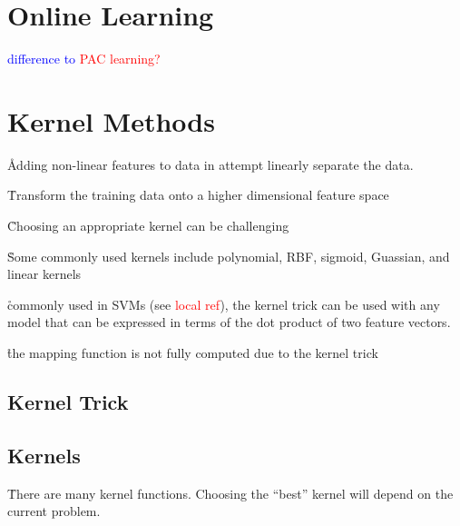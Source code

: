 \section{Online Learning}

\textcolor{blue}{difference to \textcolor{red}{PAC learning?}}


\section{Kernel Methods}
\label{sec:kernel_trick}

\r{Adding non-linear features to data in attempt linearly separate the data.}


\r{Transform the training data onto a higher dimensional feature space}


\r{Choosing an appropriate kernel can be challenging}


\r{Some commonly used kernels include polynomial, RBF, sigmoid, Guassian, and linear kernels}

\r{commonly used in SVMs (see \textcolor{red}{local ref}), the kernel trick can be used with any model that can be expressed in terms of the dot product of two feature vectors.}

\r{the mapping function is not fully computed due to the kernel trick}

\subsection{Kernel Trick}

\subsection{Kernels}

\r{There are many kernel functions. Choosing the ``best'' kernel will depend on the current problem.}

